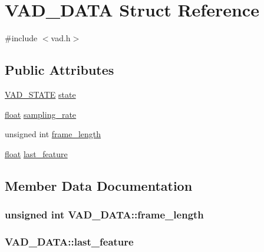 \hypertarget{structVAD__DATA}{}\section{V\+A\+D\+\_\+\+D\+A\+TA Struct Reference}
\label{structVAD__DATA}


{\ttfamily \#include $<$vad.\+h$>$}

\subsection*{Public Attributes}
\begin{DoxyCompactItemize}
\item 
\hyperlink{vad_8h_a655a5d992101d81e27b861d90c712d65}{V\+A\+D\+\_\+\+S\+T\+A\+TE} \hyperlink{structVAD__DATA_a02d71db9de6c2438820ea1cfab9187bf}{state}
\item 
\hyperlink{FFTReal__readme_8txt_a0ea2fae2a8106200bf378b90eae003cf}{float} \hyperlink{structVAD__DATA_ad2b4da91b7353a41a0fe64e65093e056}{sampling\+\_\+rate}
\item 
unsigned int \hyperlink{structVAD__DATA_a24ae8d2d4e2c13f0c930cb281ddf5ae5}{frame\+\_\+length}
\item 
\hyperlink{FFTReal__readme_8txt_a0ea2fae2a8106200bf378b90eae003cf}{float} \hyperlink{structVAD__DATA_a73be3c4f2bddba51db3f74d1df7b9286}{last\+\_\+feature}
\end{DoxyCompactItemize}


\subsection{Member Data Documentation}
\subsubsection[{\texorpdfstring{frame\+\_\+length}{frame_length}}]{\setlength{\rightskip}{0pt plus 5cm}unsigned int V\+A\+D\+\_\+\+D\+A\+T\+A\+::frame\+\_\+length}\hypertarget{structVAD__DATA_a24ae8d2d4e2c13f0c930cb281ddf5ae5}{}\label{structVAD__DATA_a24ae8d2d4e2c13f0c930cb281ddf5ae5}
\subsubsection[{\texorpdfstring{last\+\_\+feature}{last_feature}}]{ V\+A\+D\+\_\+\+D\+A\+T\+A\+::last\+\_\+feature}\hypertarget{structVAD__DATA_a73be3c4f2bddba51db3f74d1df7b9286}{}\label{structVAD__DATA_a73be3c4f2bddba51db3f74d1df7b9286}
